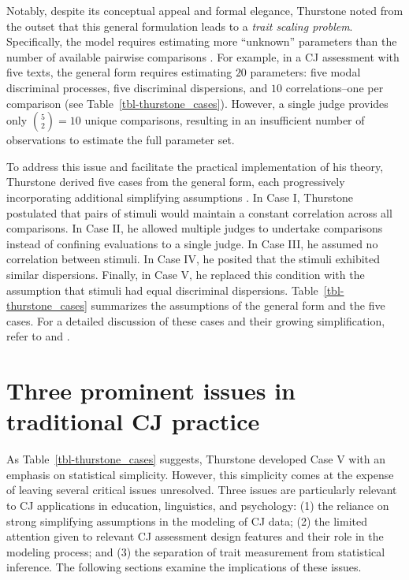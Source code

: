 \documentclass[
  authoryear,
  review,
  1p]{elsarticle}
\begin{document}
Notably, despite its conceptual appeal and formal elegance, Thurstone
noted from the outset that this general formulation leads to a
\emph{trait scaling problem}. Specifically, the model requires
estimating more ``unknown'' parameters than the number of available
pairwise comparisons \citep{Thurstone_1927b}. For example, in a CJ
assessment with five texts, the general form requires estimating \(20\)
parameters: five modal discriminal processes, five discriminal
dispersions, and \(10\) correlations--one per comparison (see
Table~\ref{tbl-thurstone_cases}). However, a single judge provides only
\({5 \choose 2} = 10\) unique comparisons, resulting in an insufficient
number of observations to estimate the full parameter set.

To address this issue and facilitate the practical implementation of his
theory, Thurstone derived five cases from the general form, each
progressively incorporating additional simplifying assumptions
\citep{Thurstone_1927b}. In Case I, Thurstone postulated that pairs of
stimuli would maintain a constant correlation across all comparisons. In
Case II, he allowed multiple judges to undertake comparisons instead of
confining evaluations to a single judge. In Case III, he assumed no
correlation between stimuli. In Case IV, he posited that the stimuli
exhibited similar dispersions. Finally, in Case V, he replaced this
condition with the assumption that stimuli had equal discriminal
dispersions. Table~\ref{tbl-thurstone_cases} summarizes the assumptions
of the general form and the five cases. For a detailed discussion of
these cases and their growing simplification, refer to
\citet{Thurstone_1927b} and \citet{Bramley_2008}.

\section{Three prominent issues in traditional CJ
practice}\label{sec-theory-issues}

As Table~\ref{tbl-thurstone_cases} suggests, Thurstone developed Case V
with an emphasis on statistical simplicity. However, this simplicity
comes at the expense of leaving several critical issues unresolved.
Three issues are particularly relevant to CJ applications in education,
linguistics, and psychology: (1) the reliance on strong simplifying
assumptions in the modeling of CJ data; (2) the limited attention given
to relevant CJ assessment design features and their role in the modeling
process; and (3) the separation of trait measurement from statistical
inference. The following sections examine the implications of these
issues.
\end{document}
